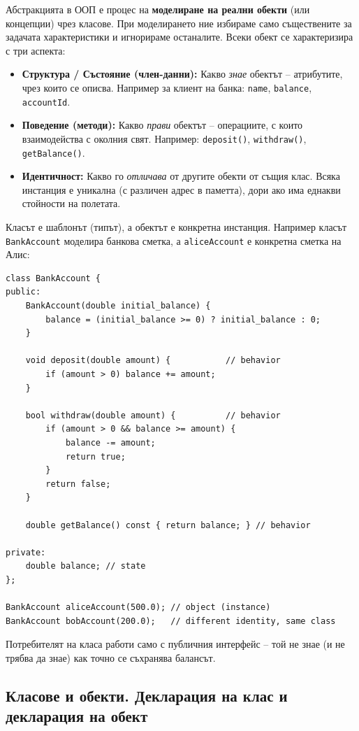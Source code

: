 \documentclass{scrartcl}
\begin{document}
\begin{FlushLeft}
Абстракцията в ООП е процес на \textbf{моделиране на реални обекти} (или концепции) чрез класове. При моделирането ние избираме само съществените за задачата характеристики и игнорираме останалите. Всеки обект се характеризира с три аспекта:

\begin{itemize}
    \item \textbf{Структура / Състояние (член-данни):} Какво \textit{знае} обектът -- атрибутите, чрез които се описва. Например за клиент на банка: \texttt{name}, \texttt{balance}, \texttt{accountId}.
    \item \textbf{Поведение (методи):} Какво \textit{прави} обектът -- операциите, с които взаимодейства с околния свят. Например: \texttt{deposit()}, \texttt{withdraw()}, \texttt{getBalance()}.
    \item \textbf{Идентичност:} Какво го \textit{отличава} от другите обекти от същия клас. Всяка инстанция е уникална (с различен адрес в паметта), дори ако има еднакви стойности на полетата.
\end{itemize}

Класът е шаблонът (типът), а обектът е конкретна инстанция. Например класът \texttt{BankAccount} моделира банкова сметка, а \texttt{aliceAccount} е конкретна сметка на Алис:

\begin{lstlisting}
class BankAccount {
public:
    BankAccount(double initial_balance) {
        balance = (initial_balance >= 0) ? initial_balance : 0;
    }

    void deposit(double amount) {           // behavior
        if (amount > 0) balance += amount;
    }

    bool withdraw(double amount) {          // behavior
        if (amount > 0 && balance >= amount) {
            balance -= amount;
            return true;
        }
        return false;
    }

    double getBalance() const { return balance; } // behavior

private:
    double balance; // state
};

BankAccount aliceAccount(500.0); // object (instance)
BankAccount bobAccount(200.0);   // different identity, same class
\end{lstlisting}

Потребителят на класа работи само с публичния интерфейс -- той не знае (и не трябва да знае) как точно се съхранява балансът.

\subsection{Класове и обекти. Декларация на клас и декларация на обект}


\end{FlushLeft}
\end{document}
